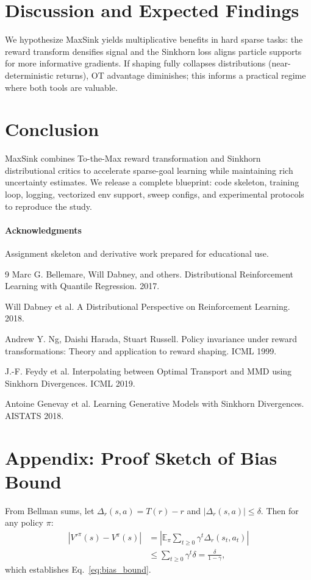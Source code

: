 \documentclass{article}
\begin{document}
\section{Discussion and Expected Findings}
We hypothesize MaxSink yields multiplicative benefits in hard sparse tasks: the reward transform densifies signal and the Sinkhorn loss aligns particle supports for more informative gradients. If shaping fully collapses distributions (near-deterministic returns), OT advantage diminishes; this informs a practical regime where both tools are valuable.

\section{Conclusion}
MaxSink combines To-the-Max reward transformation and Sinkhorn distributional critics to accelerate sparse-goal learning while maintaining rich uncertainty estimates. We release a complete blueprint: code skeleton, training loop, logging, vectorized env support, sweep configs, and experimental protocols to reproduce the study.

\paragraph{Acknowledgments}
Assignment skeleton and derivative work prepared for educational use.


\begin{thebibliography}{9}
Marc G. Bellemare, Will Dabney, and others.
Distributional Reinforcement Learning with Quantile Regression. 2017.

Will Dabney et al. A Distributional Perspective on Reinforcement Learning. 2018.

Andrew Y. Ng, Daishi Harada, Stuart Russell. Policy invariance under reward transformations: Theory and application to reward shaping. ICML 1999.

J.-F. Feydy et al. Interpolating between Optimal Transport and MMD using Sinkhorn Divergences. ICML 2019.

Antoine Genevay et al. Learning Generative Models with Sinkhorn Divergences. AISTATS 2018.

\end{thebibliography}

\appendix
\section{Appendix: Proof Sketch of Bias Bound}
From Bellman sums, let $\Delta_r(s,a)=T(r)-r$ and $|\Delta_r(s,a)|\le\delta$. Then for any policy $\pi$:
\begin{align}
|V'^\pi(s)-V^\pi(s)| &= \left|\mathbb{E}_\pi\sum_{t\ge0}\gamma^t \Delta_r(s_t,a_t)\right|\nonumber\\
&\le \sum_{t\ge0}\gamma^t \delta = \frac{\delta}{1-\gamma},
\end{align}
which establishes Eq.~\ref{eq:bias_bound}.
\end{document}

